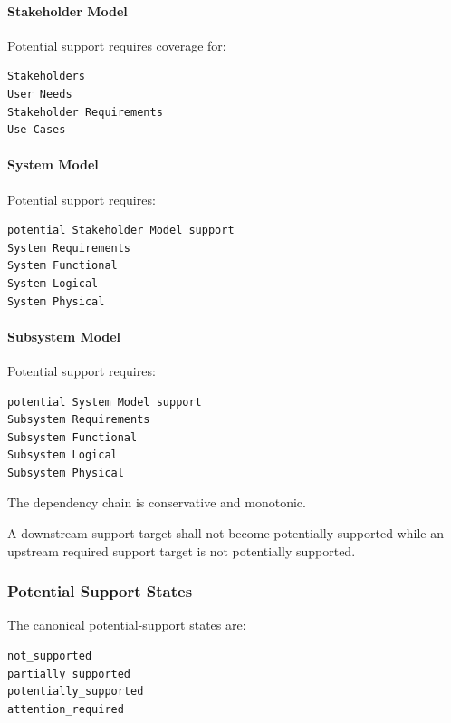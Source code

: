 \hypertarget{stakeholder-model}{%
\paragraph{Stakeholder Model}\label{stakeholder-model}}

Potential support requires coverage for:

\begin{verbatim}
Stakeholders
User Needs
Stakeholder Requirements
Use Cases
\end{verbatim}

\hypertarget{system-model}{%
\paragraph{System Model}\label{system-model}}

Potential support requires:

\begin{verbatim}
potential Stakeholder Model support
System Requirements
System Functional
System Logical
System Physical
\end{verbatim}

\hypertarget{subsystem-model}{%
\paragraph{Subsystem Model}\label{subsystem-model}}

Potential support requires:

\begin{verbatim}
potential System Model support
Subsystem Requirements
Subsystem Functional
Subsystem Logical
Subsystem Physical
\end{verbatim}

The dependency chain is conservative and monotonic.

A downstream support target shall not become potentially supported while an upstream required support target is not potentially supported.

\hypertarget{potential-support-states}{%
\subsubsection{Potential Support States}\label{potential-support-states}}

The canonical potential-support states are:

\begin{verbatim}
not_supported
partially_supported
potentially_supported
attention_required
\end{verbatim}

